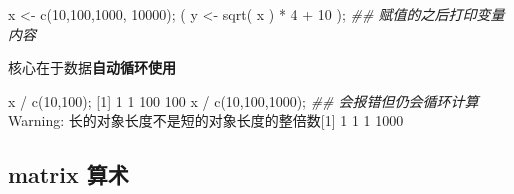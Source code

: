 \documentclass[
]{article}
\newenvironment{Shaded}{}{}
\newcommand{\DecValTok}[1]{\textcolor[rgb]{0.25,0.63,0.44}{#1}}
\newcommand{\DocumentationTok}[1]{\textcolor[rgb]{0.73,0.13,0.13}{\textit{#1}}}
\newcommand{\FunctionTok}[1]{\textcolor[rgb]{0.02,0.16,0.49}{#1}}
\newcommand{\NormalTok}[1]{#1}
\newcommand{\OtherTok}[1]{\textcolor[rgb]{0.00,0.44,0.13}{#1}}
\newcommand{\SpecialCharTok}[1]{\textcolor[rgb]{0.25,0.44,0.63}{#1}}
\begin{document}
\begin{Shaded}
\begin{Highlighting}[]
\NormalTok{x }\OtherTok{\textless{}{-}} \FunctionTok{c}\NormalTok{(}\DecValTok{10}\NormalTok{,}\DecValTok{100}\NormalTok{,}\DecValTok{1000}\NormalTok{, }\DecValTok{10000}\NormalTok{);}
\NormalTok{( y }\OtherTok{\textless{}{-}} \FunctionTok{sqrt}\NormalTok{( x  ) }\SpecialCharTok{*} \DecValTok{4} \SpecialCharTok{+} \DecValTok{10}\NormalTok{  ); }\DocumentationTok{\#\# 赋值的之后打印变量内容 }
\end{Highlighting}
\end{Shaded}

核心在于数据\textbf{自动循环使用}

\begin{Shaded}
\begin{Highlighting}[]
\NormalTok{x }\SpecialCharTok{/} \FunctionTok{c}\NormalTok{(}\DecValTok{10}\NormalTok{,}\DecValTok{100}\NormalTok{);}
\NormalTok{[}\DecValTok{1}\NormalTok{]   }\DecValTok{1}   \DecValTok{1} \DecValTok{100} \DecValTok{100}
\NormalTok{x }\SpecialCharTok{/} \FunctionTok{c}\NormalTok{(}\DecValTok{10}\NormalTok{,}\DecValTok{100}\NormalTok{,}\DecValTok{1000}\NormalTok{); }\DocumentationTok{\#\# 会报错但仍会循环计算}
\NormalTok{Warning}\SpecialCharTok{:}\NormalTok{ 长的对象长度不是短的对象长度的整倍数[}\DecValTok{1}\NormalTok{]    }\DecValTok{1}    \DecValTok{1}    \DecValTok{1} \DecValTok{1000}
\end{Highlighting}
\end{Shaded}

\hypertarget{matrix-ux7b97ux672f}{%
\subsection{matrix 算术}\label{matrix-ux7b97ux672f}}
\end{document}
